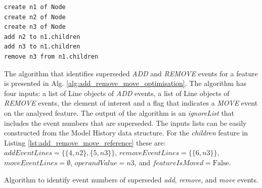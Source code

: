 \documentclass[12pt, a4paper]{report} \usepackage[titletoc]{appendix}
\begin{document}
\begin{lstlisting}[style=eol,caption={Example of change-based persistence representation of attribute \emph{values}'s add and remove operations.},label=lst:add_remove_move_reference]
create n1 of Node
create n2 of Node
create n3 of Node
add n2 to n1.children
add n3 to n1.children
remove n3 from n1.children
\end{lstlisting}

The algorithm that identifies superseded \emph{ADD} and \emph{REMOVE} events for a feature is presented in Alg. \ref{alg:add_remove_move_optimisation}. The algorithm has four inputs: a list of Line objects of \emph{ADD} events, a list of Line objects of \emph{REMOVE} events, the element of interest and a flag that indicates a \emph{MOVE} event on the analysed feature.  The output of the algorithm is an \emph{ignoreList} that includes the event numbers that are superseded. The inputs lists can be easily constructed from the Model History data structure. For the \emph{children} feature in Listing \ref{lst:add_remove_move_reference} these are: $addEventLines=\{\{4,n2\},\{5,n3\}\}$, $removeEventLines=\{\{6,n3\}\}$, $moveEventLines=\emptyset$, $operandValue=n3$, and $featureIsMoved=\mathrm{False}$.

\begin{algorithm}[H]
    \begin{small}
    \end{small}
    \caption{Algorithm to identify event numbers of superseded \emph{add}, \emph{remove}, and \emph{move} events.}
    \label{alg:add_remove_move_optimisation}
\end{algorithm}
\end{document}
